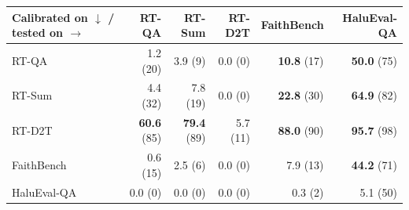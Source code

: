 \begin{tabular}{lrrrrr}
\toprule
Calibrated on $\downarrow$ / tested on $\rightarrow$ & RT-QA & RT-Sum & RT-D2T & FaithBench & HaluEval-QA \\
\midrule
RT-QA & 1.2 (20) & 3.9 (9) & 0.0 (0) & \textbf{10.8} (17) & \textbf{50.0} (75) \\
RT-Sum & 4.4 (32) & 7.8 (19) & 0.0 (0) & \textbf{22.8} (30) & \textbf{64.9} (82) \\
RT-D2T & \textbf{60.6} (85) & \textbf{79.4} (89) & 5.7 (11) & \textbf{88.0} (90) & \textbf{95.7} (98) \\
FaithBench & 0.6 (15) & 2.5 (6) & 0.0 (0) & 7.9 (13) & \textbf{44.2} (71) \\
HaluEval-QA & 0.0 (0) & 0.0 (0) & 0.0 (0) & 0.3 (2) & 5.1 (50) \\
\bottomrule
\end{tabular}

